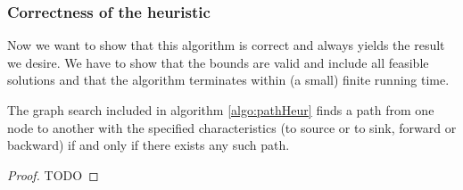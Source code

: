 \newpage 
\subsubsection{Correctness of the heuristic}
Now we want to show that this algorithm is correct and always yields the result we desire. We have to show that the 
bounds are valid and include all feasible solutions and that the algorithm terminates within (a small) finite running 
time.

\begin{lemma}\label{lemma:graphSearch}
 The graph search included in algorithm \ref{algo:pathHeur} finds a path from one node to another with the specified 
characteristics (to source or to sink, forward or backward) if and only if there exists any such path.
\end{lemma}
\begin{proof}
 TODO
\end{proof}




